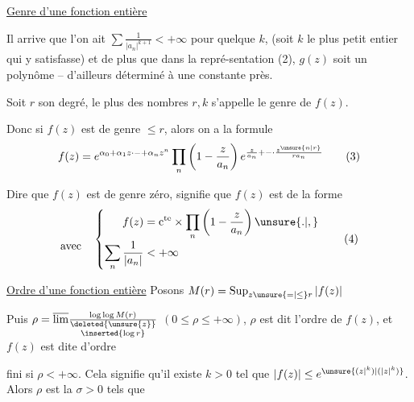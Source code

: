 
\uline{Genre d'une fonction entière}

Il arrive que l'on ait $\sum\frac{1}{|a_n|^{k+1}}<+\infty$ pour quelque $k$, (soit $k$ le plus petit entier qui y satisfasse) et de plus que dans la repré-\newline sentation (2), $g(z)$ soit un polynôme -- d'ailleurs déterminé à une constante près.

Soit $r$ son degré, le plus   des nombres $r,k$ s'appelle le genre de $f(z)$.

Donc si $f(z)$ est de genre $\leq r$, alors on a la formule
\[
f(z)=e^{\alpha_0+\alpha_1 z\mathord{\cdot}\mathord{-}+\alpha_n z^n}\prod_n\left(1-\frac{z}{a_n}\right)e^{\frac{z}{a_n}+\mathord{-}\mathord{\cdot}\frac{z^{\unsure{n|r}}}{r a_n}}\tag*{(3)}
\]

Dire que $f(z)$ est de genre zéro, signifie que $f(z)$ est de la forme
\[
\begin{aligned}\vphantom{f(z)}\\[-2pt]\text{avec}\quad\end{aligned}
\left\{\begin{aligned}
f(z)&=\mathrm c^{\mathrm{te}}\times\prod_n\left(1-\frac{z}{a_n}\right)\unsure{.|,}\\[-2pt]
\sum_n\frac{1}{|a_n|}&<+\infty
\end{aligned}\right.\tag*{(4)}
\]

\uline{Ordre d'une fonction entière} \quad Posons $M(r)=\mathop{\rm Sup}_{z\unsure{=|\leq}r}|f(z)|$

Puis $\rho=\overline{\lim}\frac{\log\log M(r)}{\substack{\deleted{\unsure{z}}\\\inserted{\log r}}}$ \quad $(0\leq\rho\leq+\infty)$, $\rho$ est dit l'ordre de $f(z)$, et $f(z)$ est dite d'ordre
\par\noindent\hspace{2cm}\unsure{$=$}\par\noindent
fini si $\rho<+\infty$. Cela signifie qu'il existe $k>0$ tel que $|f(z)|\leq e^{\unsure{(z\vert^k)|(\lvert z\rvert^k)}}$. Alors $\rho$ est la   $\sigma>0$ tels que

